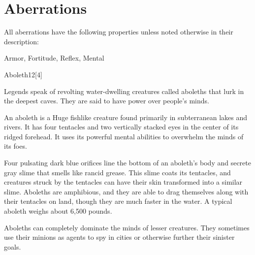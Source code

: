 
        \newpage
        \section{Aberrations}

        All aberrations have the following properties unless noted otherwise in their description:
        
    
     Armor,
     Fortitude,
     Reflex,
     Mental
  
  
      
  \begin{monsection}{Aboleth}{12}[4]
    \vspace{-1em}\vspace{-1em}
    \vspace{0em}

    
      Legends speak of revolting water-dwelling creatures called aboleths that lurk in the deepest caves.
      They are said to have power over people's minds.
    
      An aboleth is a Huge fishlike creature found primarily in subterranean lakes and rivers.
      It has four tentacles and two vertically stacked eyes in the center of its ridged forehead.
      It uses its powerful mental abilities to overwhelm the minds of its foes.
    
      Four pulsating dark blue orifices line the bottom of an aboleth's body and secrete gray slime that smells like rancid grease.
      This slime coats its tentacles, and creatures struck by the tentacles can have their skin transformed into a similar slime.
      Aboleths are amphibious, and they are able to drag themselves along with their tentacles on land, though they are much faster in the water.
      A typical aboleth weighs about 6,500 pounds.
    
      Aboleths can completely dominate the minds of lesser creatures.
      They sometimes use their minions as agents to spy in cities or otherwise further their sinister goals.
    


\end{monsection}

